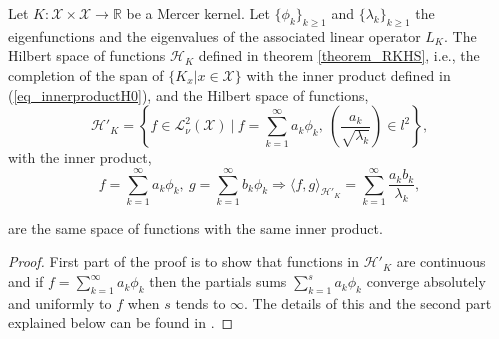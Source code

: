 \begin{theorem} \label{theorem_HkandHthesame}
  Let $K: \mathcal{X} \times \mathcal{X} \to \mathbb{R}$ be a Mercer kernel. Let $\{\phi_k\}_{k \geq 1}$ and $\{\lambda_k\}_{k \geq 1}$ the eigenfunctions and the eigenvalues of the associated linear operator $L_K$. The Hilbert space of functions $\mathcal{H}_K$ defined in theorem \ref{theorem_RKHS}, i.e., the completion of the span of $\{K_x | x \in \mathcal{X} \}$ with the inner product defined in (\ref{eq_innerproductH0}), and the Hilbert space of functions,
  \begin{equation*}
    \mathcal{H}'_K = \left\{ f \in \mathcal{L}_{\nu}^2(\mathcal{X}) \ | \ 
                             f = \sum_{k=1}^{\infty} a_k \phi_k, \ 
                             \left( \frac{a_k}{\sqrt{\lambda_k}} \right) \in l^2 \right\},
  \end{equation*}
with the inner product,
  \begin{equation*}
    f = \sum_{k=1}^{\infty} a_k \phi_k, \ g = \sum_{k=1}^{\infty} b_k \phi_k 
        \Rightarrow \langle f,g \rangle_{\mathcal{H}'_K} =  
        \sum_{k=1}^{\infty} \frac{a_k b_k}{\lambda_k}, 
  \end{equation*}

  are the same space of functions with the same inner product.
  \begin{proof}
    First part of the proof is to show that functions in $\mathcal{H}'_K$ are continuous and if $f = \sum_{k=1}^{\infty} a_k \phi_k$ then the partials sums $\sum_{k=1}^{s} a_k \phi_k$ converge absolutely and uniformly to $f$ when $s$ tends to $\infty$. The details of this and the second part explained below can be found in \textcite{cucker2001}. 


\end{proof}
\end{theorem}
